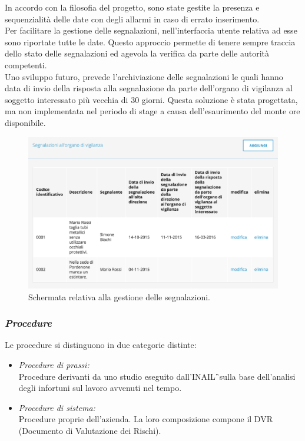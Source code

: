 	In accordo con la filosofia del progetto, sono state gestite la presenza e sequenzialità delle date con degli allarmi in caso di errato inserimento.\\
	Per facilitare la gestione delle segnalazioni, nell'interfaccia utente relativa ad esse sono riportate tutte le date. Questo approccio permette di tenere sempre traccia dello stato delle segnalazioni ed agevola la verifica da parte delle autorità competenti.\\
	Uno sviluppo futuro, prevede l'archiviazione delle segnalazioni le quali hanno data di invio della risposta alla segnalazione da parte dell'organo di vigilanza al soggetto interessato più vecchia di 30 giorni. Questa soluzione è stata progettata, ma non implementata nel periodo di stage a causa dell'esaurimento del monte ore disponibile.
	\begin{figure}[H]
		\begin{center}
			\includegraphics[width=12cm]{Pics/ScreenSegnalazioni.png}
			\caption{Schermata relativa alla gestione delle segnalazioni.}
			\label{fig:ScreenSegnalazioni}
		\end{center}
	\end{figure}
\newpage
\subsubsection{\textit{Procedure}}
	Le procedure si distinguono in due categorie distinte:
	\begin{itemize}
		\item \textit{Procedure di prassi:}	\\
			Procedure derivanti da uno studio eseguito dall'\gls{INAIL}\G\ sulla base dell'analisi degli infortuni sul lavoro avvenuti nel tempo.
		\item \textit{Procedure di sistema:}\\
			Procedure proprie dell'azienda. La loro composizione compone il  \gls{DVR} (Documento di Valutazione dei Rischi).
	\end{itemize}

